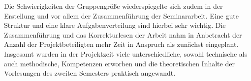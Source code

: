 	Die Schwierigkeiten der Gruppengröße wiederspiegelte sich zudem in der Erstellung und vor allem der Zusammenführung der Seminararbeit. Eine gute Struktur und eine klare Aufgabenverteilung sind hierbei sehr wichtig. Die Zusammenführung und das Korrekturlesen der Arbeit nahm in Anbetracht der Anzahl der Projektbeteiligten mehr Zeit in Anspruch als zunächst eingeplant.
	Insgesamt wurden in der Projektzeit viele unterschiedliche, sowohl technische als auch methodische, Kompetenzen erworben und die theoretischen Inhalte der Vorlesungen des zweiten Semesters praktisch angewandt.
	
	
	
	